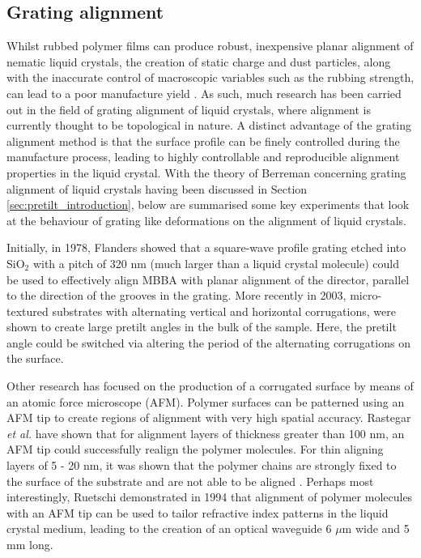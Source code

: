 \subsection{Grating alignment}
Whilst rubbed polymer films can produce robust, inexpensive planar alignment of nematic liquid crystals, the creation of static charge and dust particles, along with the inaccurate control of macroscopic variables such as the rubbing strength, can lead to a poor manufacture yield \cite{Hallam1999}. As such, much research has been carried out in the field of grating alignment of liquid crystals, where alignment is currently thought to be topological in nature. A distinct advantage of the grating alignment method is that the surface profile can be finely controlled during the manufacture process, leading to highly controllable and reproducible alignment properties in the liquid crystal. With the theory of Berreman \cite{Berreman1972a} concerning grating alignment of liquid crystals having been discussed in Section \ref{sec:pretilt_introduction}, below are summarised some key experiments that look at the behaviour of grating like deformations on the alignment of liquid crystals.

Initially, in 1978, Flanders \cite{Flanders1978} showed that a square-wave profile grating etched into SiO$_2$ with a pitch of 320 nm (much larger than a liquid crystal molecule) could be used to effectively align MBBA with planar alignment of the director, parallel to the direction of the grooves in the grating. More recently in 2003, micro-textured substrates with alternating vertical and horizontal corrugations, were shown to create large pretilt angles in the bulk of the sample. Here, the pretilt angle could be switched via altering the period of the alternating corrugations on the surface\cite{Zhang2003}.

Other research has focused on the production of a corrugated surface by means of an atomic force microscope (AFM). Polymer surfaces can be patterned using an AFM tip to create regions of alignment with very high spatial accuracy. Rastegar \textit{et al.} have shown that for alignment layers of thickness greater than 100 nm, an AFM tip could successfully realign the polymer molecules. For thin aligning layers of 5 - 20 nm, it was shown that the polymer chains are strongly fixed to the surface of the substrate and are not able to be aligned \cite{Rastegar2001}. Perhaps most interestingly, Ruetschi \cite{Ruetschi1994} demonstrated in 1994 that alignment of polymer molecules with an AFM tip can be used to tailor refractive index patterns in the liquid crystal medium, leading to the creation of an optical waveguide 6 $\mu$m wide and 5 mm long.



